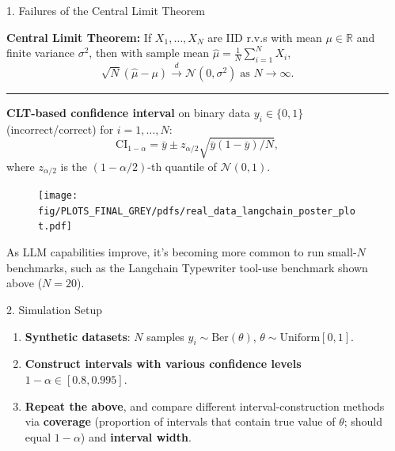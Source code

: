 \documentclass[final]{beamer}
\newlength{\sepwidth}
\newlength{\colwidth}
\newcommand{\separatorcolumn}{\begin{column}{\sepwidth}\end{column}}
\begin{document}
\begin{frame}[fragile]
\begin{columns}[t]
\separatorcolumn

\begin{column}{\colwidth}

  \begin{exampleblock}{1. Failures of the Central Limit Theorem}

    \textbf{Central Limit Theorem:}
    If $X_1, \ldots, X_N$ are IID r.v.s with mean $\mu \in \mathbb{R}$ and finite variance $\sigma^2$, then with sample mean $\hat{\mu} = \frac{1}{N}\sum_{i=1}^N X_i$,
    $$\sqrt{N} (\hat{\mu} - \mu) \xrightarrow{d} \mathcal{N} \left( 0, \sigma^2 \right) \; \text{as } N \rightarrow \infty.$$

    \begin{center}
      \rule{0.8\textwidth}{0.4pt}
    \end{center}

    \textbf{CLT-based confidence interval} on binary data $y_i \in \{0, 1\}$ (incorrect/correct) for $i = 1, \ldots, N$:
    $$
    \text{CI}_{1-\alpha} = \bar{y} \pm z_{\alpha/2} \sqrt{\bar{y}(1-\bar{y})/N},
    $$
    where $z_{\alpha/2}$ is the $(1-\alpha/2)$-th quantile of $\mathcal{N}(0, 1)$.

    \begin{figure}
      \centering
      \texttt{[image: fig/PLOTS\_FINAL\_GREY/pdfs/real\_data\_langchain\_poster\_plot.pdf]}
    \end{figure}

    As LLM capabilities improve, it's becoming more common to run small-$N$ benchmarks, such as the Langchain Typewriter tool-use benchmark shown above ($N=20$).
    
  \end{exampleblock}

  \begin{exampleblock}{2. Simulation Setup}

    \begin{enumerate}
      \item \textbf{Synthetic datasets}: $N$ samples $y_i \sim \text{Ber}(\theta)$, $\theta \sim \text{Uniform}[0, 1]$.
      \item \textbf{Construct intervals with various confidence levels} $1-\alpha \in [0.8, 0.995]$.
      \item \textbf{Repeat the above}, and compare different interval-construction methods via \textbf{coverage} (proportion of intervals that contain true value of $\theta$; should equal $1-\alpha$) and \textbf{interval width}.
    \end{enumerate}


\end{exampleblock}
\end{column}
\end{columns}
\end{frame}
\end{document}
